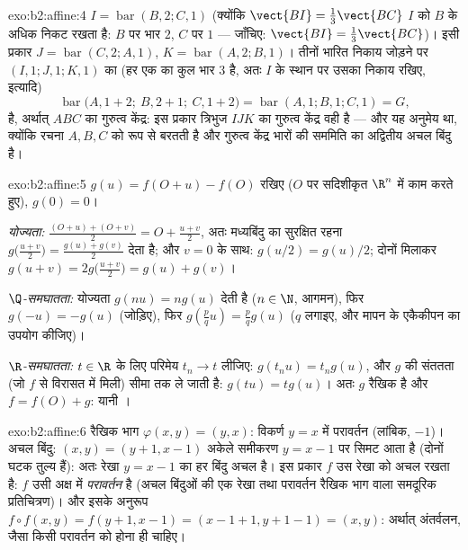 \begin{solution}{exo:b2:affine:4}
$I = \operatorname{bar}(B, 2; C, 1)$ (क्योंकि $\vect{BI} =
\frac13\vect{BC}$ $I$ को $B$ के अधिक निकट रखता है: $B$ पर भार $2$, $C$ पर
$1$ --- जाँचिए: $\vect{BI} = \frac{1}{3}\vect{BC}$)। इसी प्रकार $J = \operatorname{bar}(C, 2; A, 1)$, $K =
\operatorname{bar}(A, 2; B, 1)$। तीनों भारित निकाय जोड़ने पर
$(I, 1; J, 1; K, 1)$ का  (हर एक का कुल भार $3$ है, अतः $I$ के स्थान पर उसका
निकाय रखिए, इत्यादि)
\[
\operatorname{bar}\bigl(A, 1 + 2;\ B, 2 + 1;\ C, 1 + 2\bigr)
= \operatorname{bar}(A, 1; B, 1; C, 1) = G ,
\]
है, अर्थात् $ABC$ का गुरुत्व केंद्र: इस प्रकार त्रिभुज $IJK$ का गुरुत्व
केंद्र वही है --- और यह अनुमेय था, क्योंकि रचना $A, B, C$ को  रूप से
बरतती है और गुरुत्व केंद्र भारों की  सममिति का अद्वितीय अचल बिंदु है।
\end{solution}

\begin{solution}{exo:b2:affine:5}
$g(u) = f(O + u) - f(O)$ रखिए ($O$ पर सदिशीकृत $\R^n$ में काम करते हुए), $g(0) = 0$।

\emph{योज्यता:} $\frac{(O + u) + (O + v)}{2} = O + \frac{u +
v}{2}$, अतः मध्यबिंदु का सुरक्षित रहना $g\bigl(\frac{u+v}{2}\bigr)
= \frac{g(u) + g(v)}{2}$ देता है; और $v = 0$ के
साथ: $g(u/2) = g(u)/2$; दोनों मिलाकर $g(u + v) = 2g\bigl(\frac{u+v}{2}\bigr) = g(u) + g(v)$।

\emph{$\Q$-समघातता:} योज्यता $g(nu) = ng(u)$ देती है ($n \in
\N$, आगमन), फिर $g(-u) = -g(u)$ (जोड़िए), फिर
$g(\frac pq u) =
\frac pq g(u)$ ($q$ लगाइए, और मापन के एकैकीपन का उपयोग कीजिए)।

\emph{$\R$-समघातता:} $t \in \R$ के लिए परिमेय $t_n \to
t$ लीजिए: $g(t_nu) = t_ng(u)$, और $g$ की संततता
(जो $f$ से विरासत में मिली) सीमा तक ले जाती है: $g(tu) = tg(u)$। अतः $g$ रैखिक है और
$f =
f(O) + g$: यानी ।
\end{solution}

\begin{solution}{exo:b2:affine:6}
रैखिक भाग $\varphi(x,y) = (y, x)$: विकर्ण $y = x$ में परावर्तन (लांबिक,  $-1$)। अचल बिंदु:
$(x, y) = (y
+ 1, x - 1)$ अकेले समीकरण $y = x - 1$ पर सिमट आता है (दोनों घटक तुल्य हैं): अतः रेखा $y = x - 1$ का
हर बिंदु अचल है। इस प्रकार $f$ उस रेखा को  अचल रखता है: $f$ उसी
अक्ष में \emph{परावर्तन} है (अचल बिंदुओं की एक रेखा तथा परावर्तन रैखिक भाग
वाला समदूरिक प्रतिचित्रण)। और इसके अनुरूप $f \circ
f(x,y) = f(y+1, x-1) = (x - 1 + 1, y + 1 - 1) = (x, y)$: अर्थात् अंतर्वलन, जैसा
किसी परावर्तन को होना ही चाहिए।
\end{solution}

